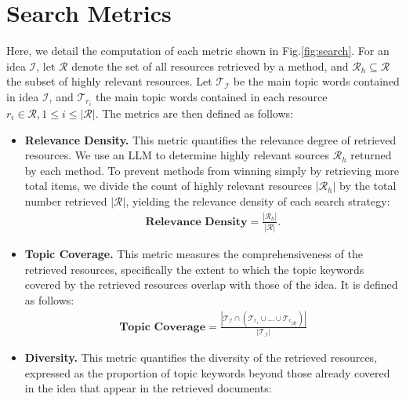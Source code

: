 \section{Search Metrics}
\label{app:search_metrics}
Here, we detail the computation of each metric shown in Fig.\ref{fig:search}.
For an idea $\boldsymbol{\mathcal{I}}$, let $\boldsymbol{\mathcal{R}}$ denote the set of all resources retrieved by a method, and $\boldsymbol{\mathcal{R}}_h\subseteq \boldsymbol{\mathcal{R}}$ the subset of highly relevant resources.
Let $\boldsymbol{\mathcal{T}}_{\boldsymbol{\mathcal{I}}}$ be the main topic words contained in idea $\boldsymbol{\mathcal{I}}$, and $\boldsymbol{\mathcal{T}}_{r_i}$ the main topic words contained in each resource $r_i\in \boldsymbol{\mathcal{R}}, 1 \leq i \leq |\boldsymbol{\mathcal{R}}|$.
The metrics are then defined as follows:
\begin{itemize}[topsep=0pt,partopsep=0pt,parsep=0pt,itemsep=0pt,leftmargin=*,labelsep=0.5em]
    \item \textbf{Relevance Density.}
    This metric quantifies the relevance degree of retrieved resources. We use an LLM to determine highly relevant sources $\boldsymbol{\mathcal{R}}_h$ returned by each method. To prevent methods from winning simply by retrieving more total items, we divide the count of highly relevant resources $|\boldsymbol{\mathcal{R}}_h|$ by the total number retrieved $|\boldsymbol{\mathcal{R}}|$, yielding the relevance density of each search strategy:
    \begin{align}
        \textbf{Relevance Density} = \frac{|\boldsymbol{\mathcal{R}}_h|}{|\boldsymbol{\mathcal{R}}|}.
    \end{align}
    \item \textbf{Topic Coverage.} This metric measures the comprehensiveness of the retrieved resources, specifically the extent to which the topic keywords covered by the retrieved resources overlap with those of the idea. It is defined as follows:
    \begin{align}
        \textbf{Topic Coverage} = \frac{|\boldsymbol{\mathcal{T}}_{\boldsymbol{\mathcal{I}}}\cap(\boldsymbol{\mathcal{T}}_{r_1}\cup\dots\cup\boldsymbol{\mathcal{T}}_{r_{|\boldsymbol{\mathcal{R}}|}})|}{|\boldsymbol{\mathcal{T}}_{\boldsymbol{\mathcal{I}}}|}
    \end{align}
    \item \textbf{Diversity.} This metric quantifies the diversity of the retrieved resources, expressed as the proportion of topic keywords beyond those already covered in the idea that appear in the retrieved documents:

\end{itemize}
